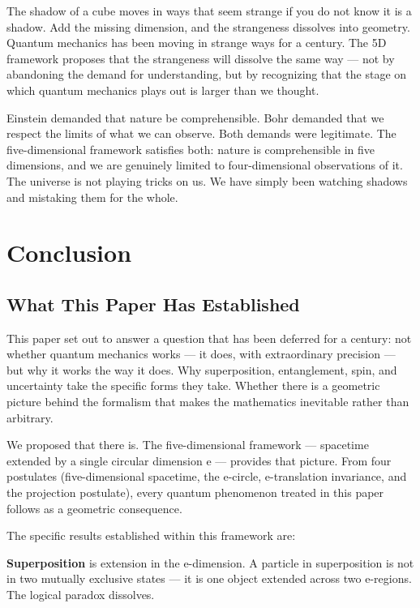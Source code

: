 \documentclass[aps,prd,preprint,superscriptaddress,longbibliography,floatfix]{revtex4-2}
\theoremstyle{remark}
\begin{document}
The shadow of a cube moves in ways that seem strange if you do not know it is a shadow. Add the missing dimension, and the strangeness dissolves into geometry. Quantum mechanics has been moving in strange ways for a century. The 5D framework proposes that the strangeness will dissolve the same way --- not by abandoning the demand for understanding, but by recognizing that the stage on which quantum mechanics plays out is larger than we thought.

Einstein demanded that nature be comprehensible. Bohr demanded that we respect the limits of what we can observe. Both demands were legitimate. The five-dimensional framework satisfies both: nature is comprehensible in five dimensions, and we are genuinely limited to four-dimensional observations of it. The universe is not playing tricks on us. We have simply been watching shadows and mistaking them for the whole.



\section{Conclusion}



\subsection{What This Paper Has Established}

This paper set out to answer a question that has been deferred for a century: not whether quantum mechanics works --- it does, with extraordinary precision --- but why it works the way it does. Why superposition, entanglement, spin, and uncertainty take the specific forms they take. Whether there is a geometric picture behind the formalism that makes the mathematics inevitable rather than arbitrary.

We proposed that there is. The five-dimensional framework --- spacetime extended by a single circular dimension e --- provides that picture. From four postulates (five-dimensional spacetime, the e-circle, e-translation invariance, and the projection postulate), every quantum phenomenon treated in this paper follows as a geometric consequence.

The specific results established within this framework are:

\textbf{Superposition} is extension in the e-dimension. A particle in superposition is not in two mutually exclusive states --- it is one object extended across two e-regions. The logical paradox dissolves.
\end{document}
